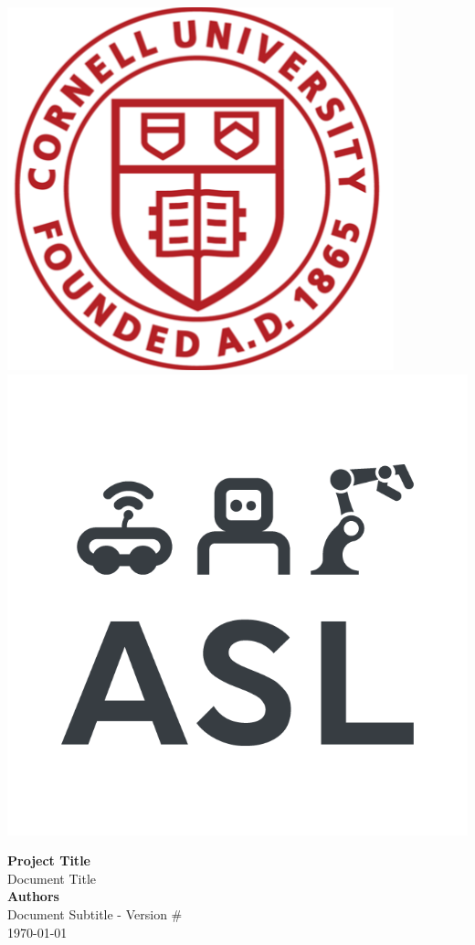 \documentclass[letterpaper, 10 pt, journal, twoside]{article}
\begin{document}
	

	\begin{vwcol}[widths={0.3,0.7},sep=0.5cm, justify=flush,rule=0.2pt,indent=0em] 
		\vspace{1cm}
		\includegraphics[width=0.145\linewidth]{cu-logo} 
		\includegraphics[width=0.145\linewidth]{asl-logo}
		
		\large{\textbf{Project Title}}\\
		Document Title\\
		\large{\textbf{Authors}}\\
		Document Subtitle - Version \#\\
		\today 
	\end{vwcol} 

\vspace{5mm}




\small


\end{document}
